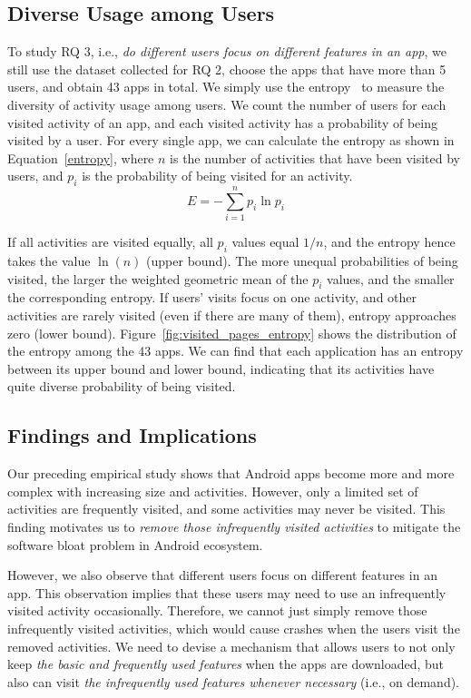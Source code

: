 \subsection{Diverse Usage among Users}
To study RQ 3, i.e., \emph{do different users focus on different features in an app}, we still use the dataset collected for RQ 2, choose the apps that have more than 5 users, and obtain 43 apps in total. We simply use the entropy~\cite{entropy} to measure the diversity of activity usage among users. We count the number of users for each visited activity of an app, and each visited activity has a probability of being visited by a user. For every single app, we can calculate the entropy as shown in Equation~\ref{entropy},  where $n$ is the number of activities that have been visited by users, and $p_{i}$ is the probability of being visited for an activity.
\setlength{\belowdisplayskip}{0pt} \setlength{\belowdisplayshortskip}{0pt}
\setlength{\abovedisplayskip}{0pt} \setlength{\abovedisplayshortskip}{0pt}
\begin{equation}
	\label{entropy}
	E=-\sum _{i=1}^{n}p_{i}\ln p_{i}
\end{equation}

If all activities are visited equally, all $p_{i}$ values equal $1 / n$, and the entropy hence takes the value $\ln(n)$ (upper bound). The more unequal probabilities of being visited, the larger the weighted geometric mean of the $p_{i}$ values, and the smaller the corresponding entropy. If users' visits focus on one activity, and other activities are rarely visited (even if there are many of them), entropy approaches zero (lower bound). Figure~\ref{fig:visited_pages_entropy} shows the distribution of the entropy among the 43 apps. We can find that each application has an entropy between its upper bound and lower bound, indicating that its activities have quite diverse probability of being visited.


\subsection{Findings and Implications}

Our preceding empirical study shows that Android apps become more and more complex with increasing size and activities. However, only a limited set of activities are frequently visited, and some activities may never be visited. This finding motivates us to \emph{remove those infrequently visited activities} to mitigate the software bloat problem in Android ecosystem.

However, we also observe that different users focus on different features in an app.  This observation implies that these users may need to use an infrequently visited activity occasionally. Therefore, we cannot just simply remove those infrequently visited activities, which would cause crashes when the users visit the removed activities.
We need to devise a mechanism that allows users to not only keep \emph{the basic and frequently used features} when the apps are downloaded,
but also can visit \emph{the infrequently used features whenever necessary} (i.e., on demand).



